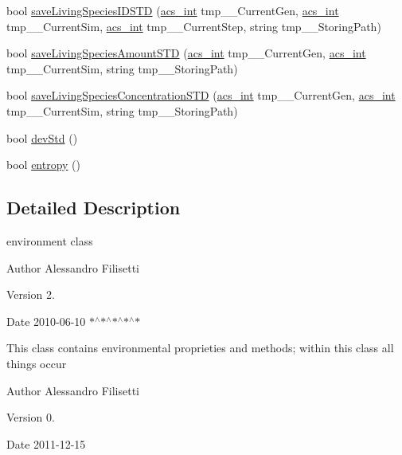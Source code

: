 \begin{DoxyCompactItemize}
\item 
bool \hyperlink{a00014_a623c3cda23a18cb7b039c5a666408d72}{save\-Living\-Species\-I\-D\-S\-T\-D} (\hyperlink{a00072_a8d277355641a098190360234e2ebde35}{acs\-\_\-int} tmp\-\_\-\-\_\-\-Current\-Gen, \hyperlink{a00072_a8d277355641a098190360234e2ebde35}{acs\-\_\-int} tmp\-\_\-\-\_\-\-Current\-Sim, \hyperlink{a00072_a8d277355641a098190360234e2ebde35}{acs\-\_\-int} tmp\-\_\-\-\_\-\-Current\-Step, string tmp\-\_\-\-\_\-\-Storing\-Path)
\item 
bool \hyperlink{a00014_a26c70b0a84c37c87952628d4a328c238}{save\-Living\-Species\-Amount\-S\-T\-D} (\hyperlink{a00072_a8d277355641a098190360234e2ebde35}{acs\-\_\-int} tmp\-\_\-\-\_\-\-Current\-Gen, \hyperlink{a00072_a8d277355641a098190360234e2ebde35}{acs\-\_\-int} tmp\-\_\-\-\_\-\-Current\-Sim, string tmp\-\_\-\-\_\-\-Storing\-Path)
\item 
bool \hyperlink{a00014_aedf8d90e1fe734948bf2213489840582}{save\-Living\-Species\-Concentration\-S\-T\-D} (\hyperlink{a00072_a8d277355641a098190360234e2ebde35}{acs\-\_\-int} tmp\-\_\-\-\_\-\-Current\-Gen, \hyperlink{a00072_a8d277355641a098190360234e2ebde35}{acs\-\_\-int} tmp\-\_\-\-\_\-\-Current\-Sim, string tmp\-\_\-\-\_\-\-Storing\-Path)
\item 
bool \hyperlink{a00014_ae7fd21d14f81c4854b3a6163b0278857}{dev\-Std} ()
\item 
bool \hyperlink{a00014_a4e9b60ec8b05e888cf0e55def03ee906}{entropy} ()
\end{DoxyCompactItemize}


\subsection{Detailed Description}
environment class 

\begin{DoxyAuthor}{Author}
Alessandro Filisetti 
\end{DoxyAuthor}
\begin{DoxyVersion}{Version}
2. 
\end{DoxyVersion}
\begin{DoxyDate}{Date}
2010-\/06-\/10 $\ast$$^\wedge$$\ast$$^\wedge$$\ast$$^\wedge$$\ast$$^\wedge$$\ast$
\end{DoxyDate}
This class contains environmental proprieties and methods; within this class all things occur \begin{DoxyAuthor}{Author}
Alessandro Filisetti 
\end{DoxyAuthor}
\begin{DoxyVersion}{Version}
0. 
\end{DoxyVersion}
\begin{DoxyDate}{Date}
2011-\/12-\/15 
\end{DoxyDate}


